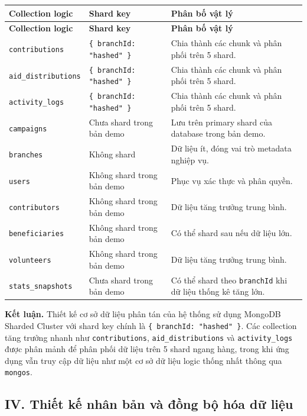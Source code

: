 \documentclass[12pt,a4paper]{article}
\begin{document}
\begin{center}
\small
\begin{longtable}{|p{3.2cm}|p{3.5cm}|p{5.8cm}|}
\hline
\textbf{Collection logic} & \textbf{Shard key} & \textbf{Phân bố vật lý} \\ \hline
\endfirsthead
\hline
\textbf{Collection logic} & \textbf{Shard key} & \textbf{Phân bố vật lý} \\ \hline
\endhead
\texttt{contributions} & \texttt{\{ branchId: "hashed" \}} & Chia thành các chunk và phân phối trên 5 shard. \\ \hline
\texttt{aid\_distributions} & \texttt{\{ branchId: "hashed" \}} & Chia thành các chunk và phân phối trên 5 shard. \\ \hline
\texttt{activity\_logs} & \texttt{\{ branchId: "hashed" \}} & Chia thành các chunk và phân phối trên 5 shard. \\ \hline
\texttt{campaigns} & Chưa shard trong bản demo & Lưu trên primary shard của database trong bản demo. \\ \hline
\texttt{branches} & Không shard & Dữ liệu ít, đóng vai trò metadata nghiệp vụ. \\ \hline
\texttt{users} & Không shard trong bản demo & Phục vụ xác thực và phân quyền. \\ \hline
\texttt{contributors} & Không shard trong bản demo & Dữ liệu tăng trưởng trung bình. \\ \hline
\texttt{beneficiaries} & Không shard trong bản demo & Có thể shard sau nếu dữ liệu lớn. \\ \hline
\texttt{volunteers} & Không shard trong bản demo & Dữ liệu tăng trưởng trung bình. \\ \hline
\texttt{stats\_snapshots} & Chưa shard trong bản demo & Có thể shard theo \texttt{branchId} khi dữ liệu thống kê tăng lớn. \\ \hline
\end{longtable}
\normalsize
\end{center}

\textbf{Kết luận.} Thiết kế cơ sở dữ liệu phân tán của hệ thống sử dụng MongoDB Sharded Cluster với shard key chính là \texttt{\{ branchId: "hashed" \}}. Các collection tăng trưởng nhanh như \texttt{contributions}, \texttt{aid\_distributions} và \texttt{activity\_logs} được phân mảnh để phân phối dữ liệu trên 5 shard ngang hàng, trong khi ứng dụng vẫn truy cập dữ liệu như một cơ sở dữ liệu logic thống nhất thông qua \texttt{mongos}.

\subsection*{IV. Thiết kế nhân bản và đồng bộ hóa dữ liệu}
\end{document}
